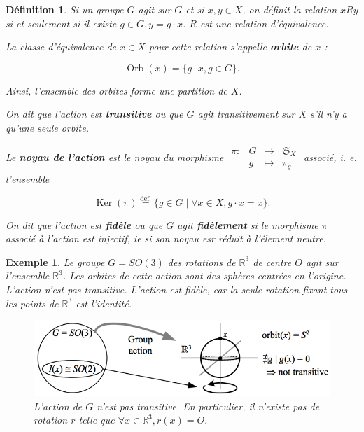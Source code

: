 \documentclass[french]{article}
\newtheorem{definition}{Définition}[section]
\newtheorem*{exemple}{Exemple}
\begin{document}
\begin{definition}
  Si un groupe \(G\) agit sur \(G\) et si  \(x,y \in X\), on définit la relation \(x R y\) si et seulement si il existe \(g \in G, y = g \cdot x\). \(R\) est une relation d'équivalence.

  La classe d'équivalence de \(x \in X\) pour cette relation s'appelle \textbf{orbite} de \(x\) :

  \begin{equation}\label{fidele}
    \operatorname{Orb}(x) = \{ g \cdot x, g \in G \}.
  \end{equation}

  Ainsi, l'ensemble des orbites forme une partition de \(X\).

  On dit que l'action est \textbf{transitive} ou que \(G\) agit transitivement sur \(X\) s'il n'y a qu'une seule orbite.

  Le \textbf{noyau de l'action} est le noyau du morphisme
  \(\begin{matrix}
  \pi : & G & \longrightarrow & \mathfrak{S}_{X}  \\
  \ & g & \longmapsto & \pi_g
  \end{matrix}\) associé, i. e. l'ensemble

  \[\operatorname{Ker}(\pi) \stackrel{\text{déf.}}{=} \{ g \in G \mid \forall x \in X, g \cdot x = x \}. \]

  On dit que l'action est \textbf{fidèle} ou que $G$ agit \textbf{fidèlement} si le morphisme $\pi$ associé à l'action est injectif, ie si son noyau esr réduit à l'élement neutre.
\end{definition}


\begin{exemple}
  Le groupe \(G = SO(3)\) des rotations de \(\mathbb{R}^3\) de centre \(O\) agit sur l'ensemble \(\mathbb{R}^3\). Les orbites de cette action sont des sphères centrées en l'origine. L'action n'est pas transitive. L'action est fidèle, car la seule rotation fixant tous les points de \(\mathbb{R}^3\) est l'identité.

  \begin{figure}[h!]
    \centering
    \includegraphics[scale=0.5]{action-groupe-rotation.png}
    \caption{L'action de \(G\) n'est pas transitive. En particulier, il n'existe pas de rotation \(r\) telle que \(\forall x \in \mathbb{R}^3, r(x) = O.\) }
    \label{action-groupe-rotation}
  \end{figure}
\end{exemple}
\end{document}

